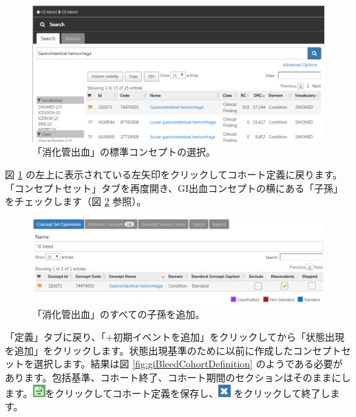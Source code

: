 \documentclass[
  11pt]{book}
\theoremstyle{definition}
\theoremstyle{definition}
\theoremstyle{definition}
\theoremstyle{definition}
\theoremstyle{remark}
\begin{document}
\begin{figure}

{\centering \includegraphics[width=1\linewidth]{images/SuggestedAnswers/giBleedSearch} 

}

\caption{「消化管出血」の標準コンセプトの選択。}\label{fig:giBleedSearch}
\end{figure}

図 \ref{fig:giBleedSearch} の左上に表示されている左矢印をクリックしてコホート定義に戻ります。「コンセプトセット」タブを再度開き、GI出血コンセプトの横にある「子孫」をチェックします（図 \ref{fig:giBleedDescendants} 参照）。

\begin{figure}

{\centering \includegraphics[width=1\linewidth]{images/SuggestedAnswers/giBleedDescendants} 

}

\caption{「消化管出血」のすべての子孫を追加。}\label{fig:giBleedDescendants}
\end{figure}

「定義」タブに戻り、「+初期イベントを追加」をクリックしてから「状態出現を追加」をクリックします。状態出現基準のために以前に作成したコンセプトセットを選択します。結果は図 \ref{fig:giBleedCohortDefinition} のようである必要があります。包括基準、コホート終了、コホート期間のセクションはそのままにします。\includegraphics{images/Cohorts/save.png}をクリックしてコホート定義を保存し、\includegraphics{images/SuggestedAnswers/close.png} をクリックして終了します。
\end{document}
